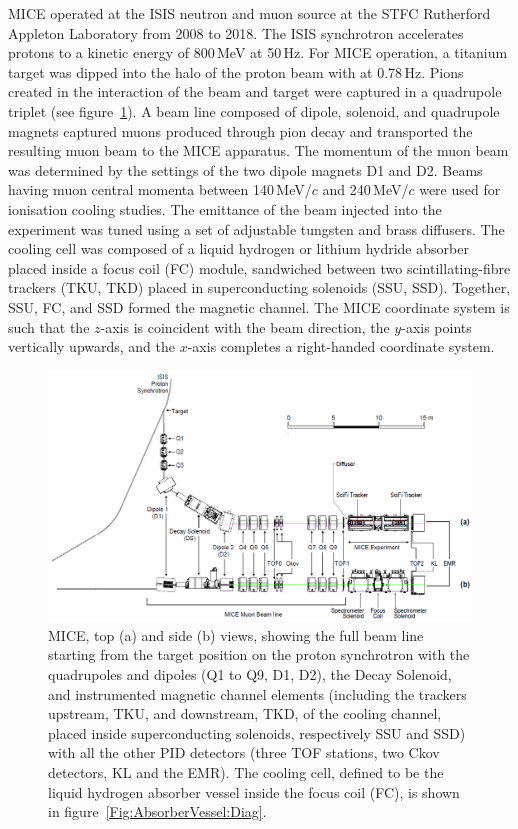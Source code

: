 MICE operated at the ISIS neutron and muon source at the STFC
Rutherford Appleton Laboratory from 2008 to 2018.  
The ISIS synchrotron accelerates protons to a kinetic energy of 800\,MeV at 50\,Hz.
For MICE operation, a titanium target was dipped
into the halo of the proton beam with at 0.78\,Hz. 
Pions created in the interaction of the beam and target were captured in a quadrupole triplet
(see figure~\ref{fig:BL}).
A beam line composed of dipole, solenoid, and quadrupole
magnets captured muons produced through pion decay and transported the
resulting muon beam to the MICE apparatus.
The momentum of the muon beam was determined by the settings of the two dipole magnets D1 and D2.
Beams having muon central momenta between 140\,MeV/$c$ and 240\,MeV/$c$ were used for ionisation cooling studies.
The emittance of the beam injected into the experiment was tuned using
a set of adjustable tungsten and brass diffusers.
The cooling cell was composed of a liquid hydrogen or lithium hydride
absorber placed inside a focus coil (FC) module, sandwiched between
two scintillating-fibre trackers (TKU, TKD) placed in superconducting
solenoids (SSU, SSD).
Together, SSU, FC, and SSD formed the magnetic channel.
The MICE coordinate system is such that the $z$-axis is coincident
with the beam direction, the $y$-axis points vertically upwards, and the
$x$-axis completes a right-handed coordinate system.

\begin{figure}[htb!]
  \begin{center}
    \includegraphics[width=1.0\columnwidth]{BL.png}
    \caption{
      MICE, top (a) and side (b) views, showing the full beam line
      starting from the target position on the proton synchrotron with the quadrupoles and dipoles (Q1 to Q9, D1, D2), the
      Decay Solenoid, and instrumented magnetic channel elements
      (including the trackers upstream, TKU, and downstream, TKD, of the cooling
      channel, placed inside superconducting solenoids, respectively SSU and SSD) with all the
      other PID detectors (three TOF stations, two Ckov detectors, KL and
      the EMR).
      The cooling cell, defined to be the liquid hydrogen absorber
      vessel inside the focus coil (FC), is shown in figure~\ref{Fig:AbsorberVessel:Diag}.
    }
    \label{fig:BL}
  \end{center}
\end{figure}

